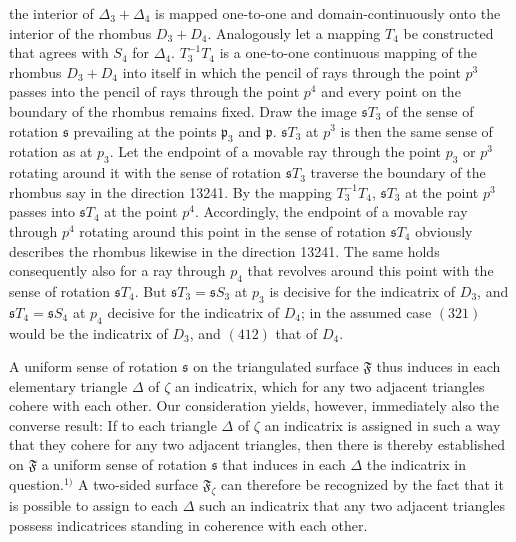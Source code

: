 \documentclass{article}
\begin{document}
the interior of $\Delta_3 + \Delta_4$ is mapped one-to-one and domain-continuously onto the interior of the rhombus $D_3 + D_4$. Analogously let a mapping $T_4$ be constructed that agrees with $S_4$ for $\Delta_4$. $T_3^{-1} T_4$ is a one-to-one continuous mapping of the rhombus $D_3 + D_4$ into itself in which the pencil of rays through the point $p^3$ passes into the pencil of rays through the point $p^4$ and every point on the boundary of the rhombus remains fixed. Draw the image $\mathfrak{s} T_3$ of the sense of rotation $\mathfrak{s}$ prevailing at the points $\mathfrak{p}_3$ and $\mathfrak{p}$. $\mathfrak{s} T_3$ at $p^3$ is then the same sense of rotation as at $p_3$. Let the endpoint of a movable ray through the point $p_3$ or $p^3$ rotating around it with the sense of rotation $\mathfrak{s} T_3$ traverse the boundary of the rhombus say in the direction 13241. By the mapping $T_3^{-1} T_4$, $\mathfrak{s} T_3$ at the point $p^3$ passes into $\mathfrak{s} T_4$ at the point $p^4$. Accordingly, the endpoint of a movable ray through $p^4$ rotating around this point in the sense of rotation $\mathfrak{s} T_4$ obviously describes the rhombus likewise in the direction 13241. The same holds consequently also for a ray through $p_4$ that revolves around this point with the sense of rotation $\mathfrak{s} T_4$. But $\mathfrak{s} T_3 = \mathfrak{s} S_3$ at $p_3$ is decisive for the indicatrix of $D_3$, and $\mathfrak{s} T_4 = \mathfrak{s} S_4$ at $p_4$ decisive for the indicatrix of $D_4$; in the assumed case $(321)$ would be the indicatrix of $D_3$, and $(412)$ that of $D_4$.


A uniform sense of rotation $\mathfrak{s}$ on the triangulated surface $\mathfrak{F}$ thus induces in each elementary triangle $\Delta$ of $\zeta$ an indicatrix, which for any two adjacent triangles cohere with each other. Our consideration yields, however, immediately also the converse result: If to each triangle $\Delta$ of $\zeta$ an indicatrix is assigned in such a way that they cohere for any two adjacent triangles, then there is thereby established on $\mathfrak{F}$ a uniform sense of rotation $\mathfrak{s}$ that induces in each $\Delta$ the indicatrix in question.${}^{1)}$ A two-sided surface $\mathfrak{F}_\zeta$ can therefore be recognized by the fact that it is possible to assign to each $\Delta$ such an indicatrix that any two adjacent triangles possess indicatrices standing in coherence with each other.
\end{document}

